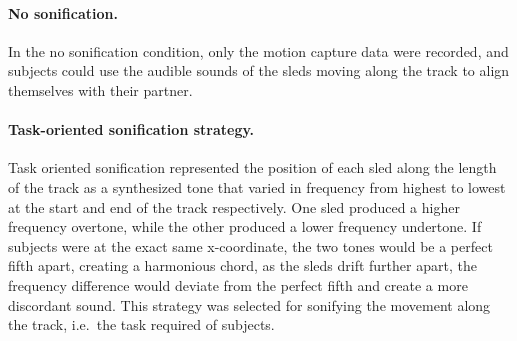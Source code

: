 \documentclass[10pt,a4paper,onecolumn]{article}
\let\oldparagraph\paragraph
\renewcommand{\paragraph}[1]{\oldparagraph{#1}\mbox{}}
\begin{document}
\hypertarget{no-sonification.}{%
\paragraph{No sonification.}\label{no-sonification.}}

In the no sonification condition, only the motion capture data were recorded, and subjects could use the audible sounds of the sleds moving along the track to align themselves with their partner.

\hypertarget{task-oriented-sonification-strategy.}{%
\paragraph{Task-oriented sonification strategy.}\label{task-oriented-sonification-strategy.}}

Task oriented sonification represented the position of each sled along the length of the track as a synthesized tone that varied in frequency from highest to lowest at the start and end of the track respectively. One sled produced a higher frequency overtone, while the other produced a lower frequency undertone. If subjects were at the exact same x-coordinate, the two tones would be a perfect fifth apart, creating a harmonious chord, as the sleds drift further apart, the frequency difference would deviate from the perfect fifth and create a more discordant sound. This strategy was selected for sonifying the movement along the track, i.e.~the task required of subjects.
\end{document}

